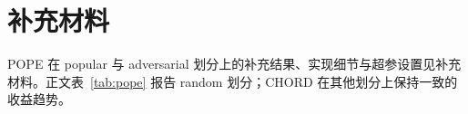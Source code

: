 \section{补充材料}

POPE 在 popular 与 adversarial 划分上的补充结果、实现细节与超参设置见补充材料。正文表~\ref{tab:pope} 报告 random 划分；CHORD 在其他划分上保持一致的收益趋势。
